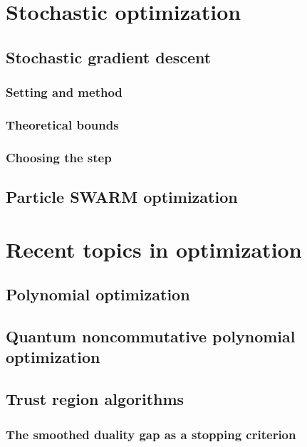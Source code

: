 \documentclass[12pt,openany,oneside]{book}
\begin{document}
\chapter{Stochastic optimization}

\section{Stochastic gradient descent}
\subsection{Setting and method}
\subsection{Theoretical bounds}
\subsection{Choosing the step}
\section{Particle SWARM optimization}

\chapter{Recent topics in optimization}

\section{Polynomial optimization}
\section{Quantum noncommutative polynomial optimization}
\section{Trust region algorithms}
\subsection{The smoothed duality gap as a stopping criterion}
\end{document}
